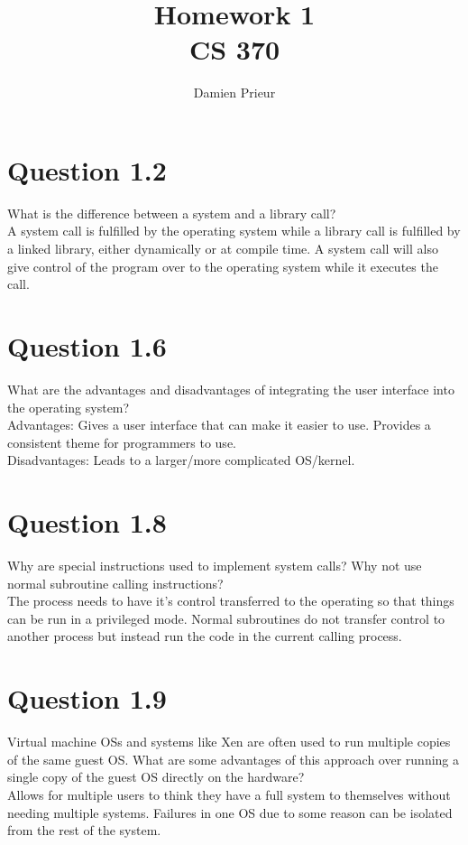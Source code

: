 \documentclass{article}
\author{Damien Prieur}
\title{Homework 1 \\ CS 370}
\date{}
\begin{document}
\maketitle

\section*{Question 1.2}
What is the difference between a system and a library call?
\\

A system call is fulfilled by the operating system while a library call is fulfilled by a linked library, either dynamically or at compile time.
A system call will also give control of the program over to the operating system while it executes the call.

\section*{Question 1.6}
What are the advantages and disadvantages of integrating the user interface into the operating system?
\\
Advantages: Gives a user interface that can make it easier to use.
Provides a consistent theme for programmers to use.
\\
Disadvantages: Leads to a larger/more complicated OS/kernel.

\section*{Question 1.8}
Why are special instructions used to implement system calls? Why not use normal subroutine calling instructions?
\\
The process needs to have it's control transferred to the operating so that things can be run in a privileged mode.
Normal subroutines do not transfer control to another process but instead run the code in the current calling process.

\section*{Question 1.9}
Virtual machine OSs and systems like Xen are often used to run multiple copies of the same guest OS.
What are some advantages of this approach over running a single copy of the guest OS directly on the hardware?
\\
Allows for multiple users to think they have a full system to themselves without needing multiple systems.
Failures in one OS due to some reason can be isolated from the rest of the system.
\end{document}
